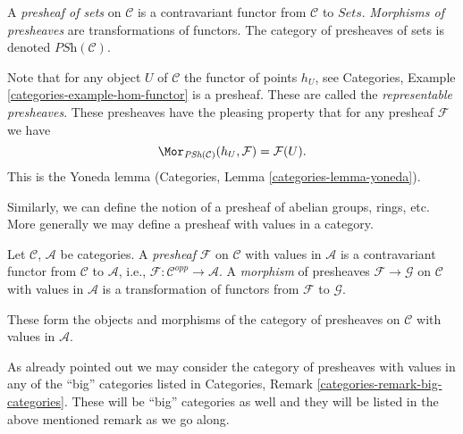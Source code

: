 \begin{definition}
\label{definition-presheaves-sets}
A {\it presheaf of sets} on $\mathcal{C}$ is a contravariant
functor from $\mathcal{C}$ to $\textit{Sets}$. {\it Morphisms
of presheaves} are transformations of functors. The category
of presheaves of sets is denoted $\textit{PSh}(\mathcal{C})$.
\end{definition}

\noindent
Note that for any object $U$ of $\mathcal{C}$ the functor of
points $h_U$, see Categories, Example \ref{categories-example-hom-functor}
is a presheaf. These are called the {\it representable presheaves}.
These presheaves have the pleasing property that for any
presheaf $\mathcal{F}$ we have
\begin{equation}
\label{equation-map-representable-into-presheaf}
\Mor_{\textit{PSh}(\mathcal{C})}(h_U, \mathcal{F})
=
\mathcal{F}(U).
\end{equation}
This is the Yoneda lemma (Categories, Lemma \ref{categories-lemma-yoneda}).

\medskip\noindent
Similarly, we can define the notion of a presheaf of abelian groups,
rings, etc. More generally we may define a presheaf with values in a
category.

\begin{definition}
\label{definition-presheaf}
Let $\mathcal{C}$, $\mathcal{A}$ be categories.
A {\it presheaf} $\mathcal{F}$ on $\mathcal{C}$
with values in $\mathcal{A}$ is a contravariant
functor from $\mathcal{C}$ to $\mathcal{A}$,
i.e., $\mathcal{F} : \mathcal{C}^{opp} \to \mathcal{A}$.
A {\it morphism} of presheaves $\mathcal{F} \to \mathcal{G}$
on $\mathcal{C}$ with values in $\mathcal{A}$ is a transformation
of functors from $\mathcal{F}$ to $\mathcal{G}$.
\end{definition}

\noindent
These form the objects and morphisms of the category of presheaves
on $\mathcal{C}$ with values in $\mathcal{A}$.

\begin{remark}
\label{remark-big-presheaves}
As already pointed out we may consider the category of
presheaves with values in any of the ``big'' categories
listed in Categories, Remark \ref{categories-remark-big-categories}.
These will be ``big'' categories as well and they will be
listed in the above mentioned remark as we go along.
\end{remark}
















